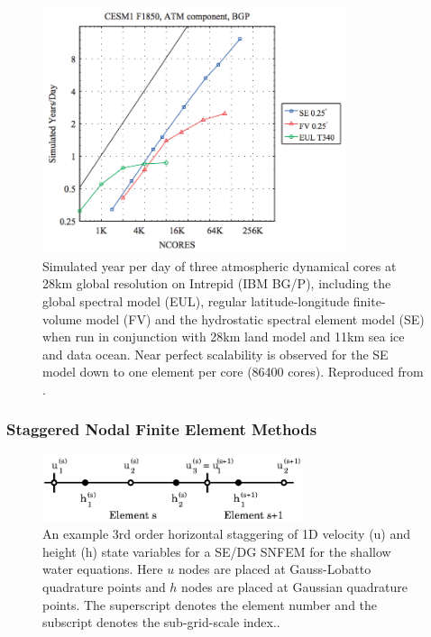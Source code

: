 \documentclass[11pt]{article}
\begin{document}
\begin{figure}[h]
\begin{center}
\includegraphics[width=3.5in]{CAMSEScalability.png}
\end{center}
\caption{Simulated year per day of three atmospheric dynamical cores at 28km global resolution on Intrepid (IBM BG/P), including the global spectral model (EUL), regular latitude-longitude finite-volume model (FV) and the hydrostatic spectral element model (SE) when run in conjunction with 28km land model and 11km sea ice and data ocean.  Near perfect scalability is observed for the SE model down to one element per core (86400 cores).  Reproduced from \cite{JDJEKJEONGetal2011IJHPCA}.} \label{fig:CAMSEScalability}
\end{figure}

\subsubsection{Staggered Nodal Finite Element Methods} \label{sec:SNFEM}

\begin{figure}
\begin{center}
\includegraphics[width=3in]{SEStaggered}
\end{center}
\caption{An example 3rd order horizontal staggering of 1D velocity (u) and height (h) state variables for a SE/DG SNFEM for the shallow water equations.  Here $u$ nodes are placed at Gauss-Lobatto quadrature points and $h$ nodes are placed at Gaussian quadrature points.  The superscript denotes the element number and the subscript denotes the sub-grid-scale index..} \label{fig:SNFEM}
\end{figure}
\end{document}
